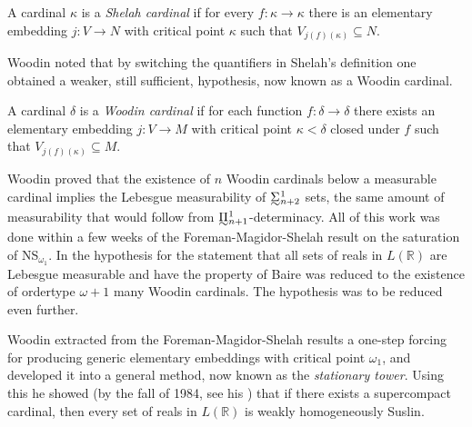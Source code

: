 \documentclass{book}%
\def\underTilde#1{{\baselineskip=0pt\vtop{\hbox{$#1$}\hbox{$\sim$}}}{}}
\newcommand{\uTPi}{\underTilde{\Pi}}
\newcommand{\uTSigma}{\underTilde{\Sigma}}
\begin{document}
\begin{definition} A cardinal $\kappa$
is a \emph{Shelah cardinal} if for every $f
\colon \kappa \to \kappa$ there is an elementary embedding $j \colon
V \to N$ with critical point $\kappa$ such that $V_{j(f)(\kappa)} \subseteq N$.
\end{definition}

Woodin
noted that by switching the quantifiers in Shelah's definition one
obtained a weaker, still sufficient, hypothesis, now known as a
Woodin cardinal.

\begin{definition} A cardinal $\delta$ is a \emph{Woodin
cardinal} if for each function $f \colon \delta \to \delta$ there
exists an elementary embedding $j \colon V \to M$ with
critical point $\kappa < \delta$ closed under $f$ such that
$V_{j(f)(\kappa)} \subseteq M$.
\end{definition}

Woodin proved that the existence of $n$ Woodin cardinals below a measurable
cardinal implies the Lebesgue measurability of
$\uTSigma^{1}_{n+2}$ sets, the same amount of
measurability that would follow from
$\uTPi^{1}_{n+1}$-determinacy.
All of this
work was done within a few weeks of the Foreman-Magidor-Shelah result on the saturation of
NS$_{\omega_{1}}$. In \cite{ShelahWoodin:1990} the hypothesis for the statement that all sets of reals in $L(\mathbb{R})$ are Lebesgue measurable and have the property of Baire was reduced to the existence of ordertype $\omega + 1$ many Woodin cardinals.  The hypothesis was to be reduced even further.

Woodin extracted from the Foreman-Magidor-Shelah results a one-step
forcing for producing generic elementary embeddings with critical
point $\omega_{1}$, and developed it into a general method, now
known as the \emph{stationary tower}. Using this he showed (by the fall of 1984, see his )
that if there exists a supercompact cardinal, then every set of
reals in $L(\mathbb{R})$ is weakly homogeneously Suslin.

\end{document}
